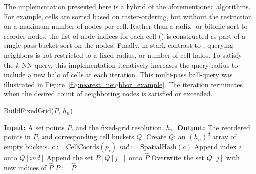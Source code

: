 \documentclass{report}
\begin{document}
The implementation presented here is a hybrid of the aforementioned algorithms. For example, cells are sorted based on raster-ordering, but without the restriction on a maximum number of nodes per cell. Rather than a radix- or bitonic sort to reorder nodes, the list of node indices for each cell (\cite{Wendland2002,WendlandBook}) is constructed as part of a single-pass bucket sort on the nodes. Finally, in stark contrast to  \cite{Krog2010,Green2010,Johnson2011,Wendland2002,WendlandBook}, querying neighbors is not restricted to a fixed radius, or number of cell halos. To satisfy the $k$-NN query, this implementation iteratively increases the query radius to include a new halo of cells at each iteration. This multi-pass ball-query was illustrated in Figure~\ref{fig:nearest_neighbor_example}. The iteration terminates when the desired count of neighboring nodes is satisfied or exceeded.

\begin{algorithm} 
\caption{BuildFixedGrid($P$, $h_n$)}         
\label{alg:fixed_grid_build}  
\begin{algorithmic}[1]    
    \State \textbf{Input:} A set points $P$, and the fixed-grid resolution, $h_n$.
    \State \textbf{Output:} The reordered points in $P$, and corresponding cell buckets $Q$.
    \State
    \State Create $Q$: an $(h_n)^d$ array of empty buckets. 
       \State $c := \text{CellCoords}(p_i)$ 
       \State $ind := \text{SpatialHash}(c)$
       \State Append index $i$ onto $Q[ind]$
    \EndFor
        \State Append the set $P[Q[j]]$ onto $\hat{P}$
        \State Overwrite the set $Q[j]$ with new indices of $\hat{P}$ 
    \EndIf
    \EndFor
    \State $P := \hat{P}$
    \State \Return 
    \end{algorithmic}
\end{algorithm}
\end{document}
